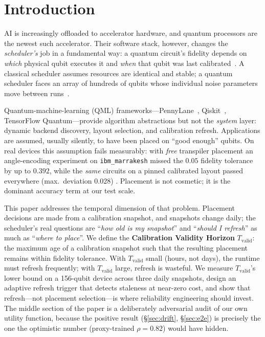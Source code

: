 \documentclass[journal,10pt,twocolumn]{IEEEtran}
\begin{document}
\section{Introduction}
 AI is increasingly offloaded to accelerator hardware, and quantum processors are the
newest such accelerator. Their software stack, however, changes the \emph{scheduler's} job in a fundamental way: a
quantum circuit's fidelity depends on \emph{which} physical qubit executes it and \emph{when} that qubit was last
calibrated~\cite{preskill2018,arute2019,murali2019noise,li2019sabre}. A classical scheduler assumes resources are
identical and stable; a quantum scheduler faces an array of hundreds of qubits whose individual noise parameters
move between runs~\cite{ibmcalib,kanazawa2021,vanberg2023}.

Quantum-machine-learning (QML) frameworks---PennyLane~\cite{berholm2018}, Qiskit~\cite{qiskit}, TensorFlow
Quantum---provide algorithm abstractions but not the \emph{system} layer: dynamic backend discovery, layout
selection, and calibration refresh. Applications are assumed, usually silently, to have been placed on ``good
enough'' qubits. On real devices this assumption fails measurably: with \emph{free} transpiler placement an
angle-encoding experiment on \texttt{ibm\_marrakesh} missed the $0.05$ fidelity tolerance by up to $0.392$,
while the \emph{same} circuits on a pinned calibrated layout passed everywhere (max.\ deviation $0.028$)
\cite{tangpu}. Placement is not cosmetic; it is the dominant accuracy term at our test scale.

This paper addresses the temporal dimension of that problem. Placement decisions are made from a calibration
snapshot, and snapshots change daily; the scheduler's real questions are ``\emph{how old is my snapshot}'' and
``\emph{should I refresh}'' as much as ``\emph{where to place}''. We define the \textbf{Calibration Validity
Horizon} $T_{\mathrm{valid}}$: the maximum age of a calibration snapshot such that the resulting placement
remains within fidelity tolerance. With $T_{\mathrm{valid}}$ small (hours, not days), the runtime must refresh
frequently; with $T_{\mathrm{valid}}$ large, refresh is wasteful. We measure $T_{\mathrm{valid}}$'s lower bound
on a 156-qubit device across three daily snapshots, design an adaptive refresh trigger that detects staleness at
near-zero cost, and show that refresh---not placement selection---is where reliability engineering should invest.
The middle section of the paper is a deliberately adversarial audit of our own utility function, because the
positive result (\S\ref{sec:drift}, \S\ref{sec:e2e}) is precisely the one the optimistic number (proxy-trained
$\rho{=}0.82$) would have hidden.
\end{document}
